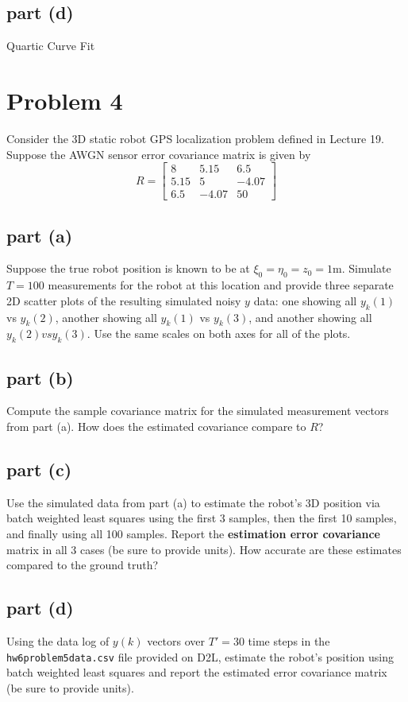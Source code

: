 \documentclass[11pt]{article}
\begin{document}
\subsection*{part (d)}
Quartic Curve Fit

\section*{Problem 4}
Consider the 3D static robot GPS localization problem defined in Lecture 19. Suppose the AWGN sensor error covariance matrix is given by 
\begin{equation*}
	R=\begin{bmatrix} 8 & 5.15 & 6.5 \\ 5.15 & 5 & -4.07 \\ 6.5 & -4.07 & 50 \end{bmatrix}
\end{equation*}

\subsection*{part (a)}
Suppose the true robot position is known to be at $\xi_0=\eta_0=z_0=1\text{m}$. Simulate $T=100$ measurements for the robot at this location and provide three separate 2D scatter plots of the resulting simulated noisy $y$ data: one showing all $y_k(1)$ vs $y_k(2)$, another showing all $y_k(1)$ vs $y_k(3)$, and another showing all $y_k(2) vs y_k(3)$. Use the same scales on both axes for all of the plots.

\subsection*{part (b)}
Compute the sample covariance matrix for the simulated measurement vectors from part (a). How does the estimated covariance compare to $R$?

\subsection*{part (c)}
Use the simulated data from part (a) to estimate the robot's 3D position via batch weighted least squares using the first 3 samples, then the first 10 samples, and finally using all 100 samples. Report the \textbf{estimation error covariance} matrix in all 3 cases (be sure to provide units). How accurate are these estimates compared to the ground truth?

\subsection*{part (d)}
Using the data log of $y(k)$ vectors over $T'=30$ time steps in the \texttt{hw6problem5data.csv} file provided on D2L, estimate the robot's position using batch weighted least squares and report the estimated error covariance matrix (be sure to provide units).
\end{document}
